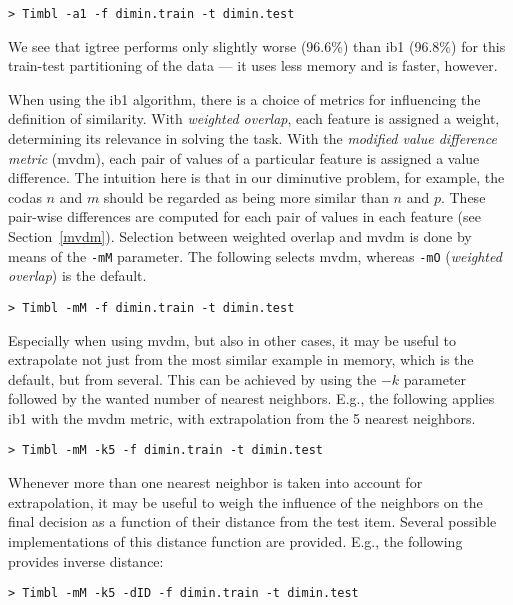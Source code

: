 \documentclass{report}
\begin{document}
{\footnotesize
\begin{verbatim}
> Timbl -a1 -f dimin.train -t dimin.test
\end{verbatim}} 

We see that {\sc igtree} performs only slightly worse (96.6\%) than
{\sc ib1} (96.8\%) for this train-test partitioning of the data --- it
uses less memory and is faster, however.

When using the {\sc ib1} algorithm, there is a choice of metrics for
influencing the definition of similarity. With {\em weighted overlap},
each feature is assigned a weight, determining its relevance in
solving the task. With the {\em modified value difference metric}
({\sc mvdm}), each pair of values of a particular feature is assigned
a value difference. The intuition here is that in our diminutive
problem, for example, the codas $n$ and $m$ should be regarded as
being more similar than $n$ and $p$. These pair-wise differences are
computed for each pair of values in each feature (see
Section~\ref{mvdm}). Selection between weighted overlap and {\sc mvdm}
is done by means of the {\tt -mM} parameter. The following selects {\sc
mvdm}, whereas {\tt -mO} ({\em weighted overlap}) is the default.

{\footnotesize
\begin{verbatim}
> Timbl -mM -f dimin.train -t dimin.test
\end{verbatim}
}

Especially when using {\sc mvdm}, but also in other cases, it may be
useful to extrapolate not just from the most similar example in
memory, which is the default, but from several. This can be achieved
by using the $-k$ parameter followed by the wanted number of nearest
neighbors. E.g., the following applies {\sc ib1} with the {\sc mvdm}
metric, with extrapolation from the 5 nearest neighbors.

{\footnotesize
\begin{verbatim}
> Timbl -mM -k5 -f dimin.train -t dimin.test
\end{verbatim}
}

Whenever more than one nearest neighbor is taken into account for
extrapolation, it may be useful to weigh the influence of the
neighbors on the final decision as a function of their distance from
the test item. Several possible implementations of this distance
function are provided. E.g., the following provides inverse distance: 

{\footnotesize
\begin{verbatim}
> Timbl -mM -k5 -dID -f dimin.train -t dimin.test
\end{verbatim}
}
\end{document}
